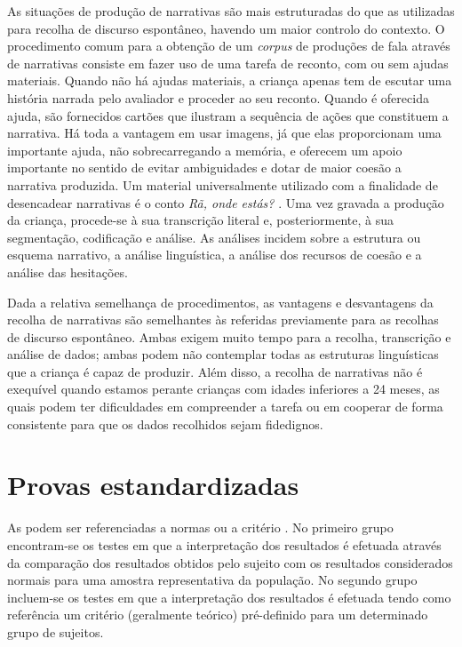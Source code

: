 \documentclass[output=paper]{LSP/langsci}
\begin{document}
As situações de produção de narrativas são mais estruturadas do que as utilizadas para recolha de discurso espontâneo, havendo um maior controlo do contexto. O procedimento comum para a obtenção de um \textit{corpus} de produções de fala através de narrativas consiste em fazer uso de uma tarefa de reconto, com ou sem ajudas materiais. Quando não há ajudas materiais, a criança apenas tem de escutar uma história narrada pelo avaliador e proceder ao seu reconto. Quando é oferecida ajuda, são fornecidos cartões que ilustram a sequência de ações que constituem a narrativa. Há toda a vantagem em usar imagens, já que elas proporcionam uma importante ajuda, não sobrecarregando a memória, e oferecem um apoio importante no sentido de evitar ambiguidades e dotar de maior coesão a narrativa produzida. Um material universalmente utilizado com a finalidade de desencadear narrativas é o conto \textit{Rã, onde estás?} \citep{mayer1969}. Uma vez gravada a produção da criança, procede-se à sua transcrição literal e, posteriormente, à sua segmentação, codificação e análise. As análises incidem sobre a estrutura ou esquema narrativo, a análise linguística, a análise dos recursos de coesão e a análise das hesitações.

Dada a relativa semelhança de procedimentos, as vantagens e desvantagens da recolha de narrativas são semelhantes às referidas previamente para as recolhas de discurso espontâneo. Ambas exigem muito tempo para a recolha, transcrição e análise de dados; ambas podem não contemplar todas as estruturas linguísticas que a criança é capaz de produzir. Além disso, a recolha de narrativas não é exequível quando estamos perante crianças com idades inferiores a 24 meses, as quais podem ter dificuldades em compreender a tarefa ou em cooperar de forma consistente para que os dados recolhidos sejam fidedignos.

\section{Provas estandardizadas}
\label{subsec:viana_provas_estandard}

As  podem ser referenciadas a normas ou a critério \citep{almeidaviana2010}. No primeiro grupo encontram-se os testes em que a interpretação dos resultados é efetuada através da comparação dos resultados obtidos pelo sujeito com os resultados considerados normais para uma amostra representativa da população. No segundo grupo incluem-se os testes em que a interpretação dos resultados é efetuada tendo como referência um critério (geralmente teórico) pré-definido para um determinado grupo de sujeitos.
\end{document}
